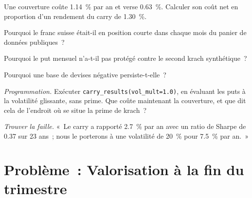 \begin{exercise}[$\star$]\label{exo:s2:cross-currency-basis-and-fx-carry:3}
Une couverture coûte 1.14~\% par an et verse 0.63~\%. Calculer son coût net en proportion d'un rendement du carry de 1.30~\%.
\end{exercise}

\begin{exercise}[$\star\star$]\label{exo:s2:cross-currency-basis-and-fx-carry:4}
Pourquoi le franc suisse était-il en position courte dans chaque mois du panier de données publiques~?
\end{exercise}

\begin{exercise}[$\star\star$]\label{exo:s2:cross-currency-basis-and-fx-carry:5}
Pourquoi le put mensuel n'a-t-il pas protégé contre le second krach synthétique~?
\end{exercise}

\begin{exercise}[$\star\star$]\label{exo:s2:cross-currency-basis-and-fx-carry:6}
Pourquoi une base de devises négative persiste-t-elle~?
\end{exercise}

\begin{exercise}[$\star\star\star$]\label{exo:s2:cross-currency-basis-and-fx-carry:7}
\emph{Programmation.} Exécuter \texttt{carry\_results(vol\_mult=1.0)}, en évaluant les puts à la volatilité glissante, sans prime. Que coûte maintenant la couverture, et
que dit cela de l'endroit où se situe la prime de krach~?
\end{exercise}

\begin{exercise}[$\star\star\star$]\label{exo:s2:cross-currency-basis-and-fx-carry:8}
\emph{Trouver la faille.} «~Le carry a rapporté 2.7~\% par an avec un ratio de Sharpe de 0.37 sur 23 ans~; nous le porterons à une volatilité de 20~\% pour 7.5~\% par an.~»
\end{exercise}

\section{Problème~: Valorisation à la fin du trimestre}

